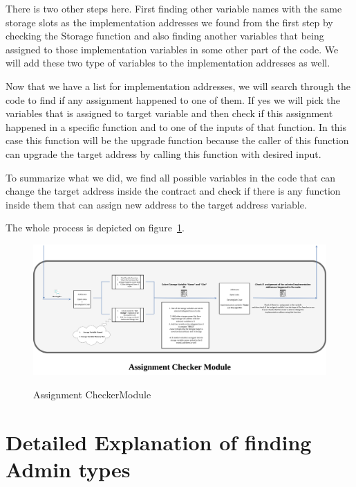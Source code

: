 There is two other steps here. First finding other variable names with the same storage slots as the implementation addresses we found from the first step by checking the Storage function and also finding another variables that being assigned to those implementation variables in some other part of the code. We will add these two type of variables to the implementation addresses as well.

Now that we have a list for implementation addresses, we will search through the code to find if any assignment happened to one of them. If yes we will pick the variables that is assigned to target variable and then check if this assignment happened in a specific function and to one of the inputs of that function. In this case this function will be the upgrade function because the caller of this function can upgrade the target address by calling this function with desired input. 

To summarize what we did, we find all possible variables in the code that can change the target address inside the contract and check if there is any function inside them that can assign new address to the target address variable.

The whole process is depicted on figure~\ref{assignmentFinder}.

\begin{figure}[t]
  \includegraphics[width=1\textwidth]{figures/Assignment_finder.png}\label{assignmentFinder}
  \caption{Assignment CheckerModule}
\end{figure}


\clearpage
\section{Detailed Explanation of finding Admin types}


